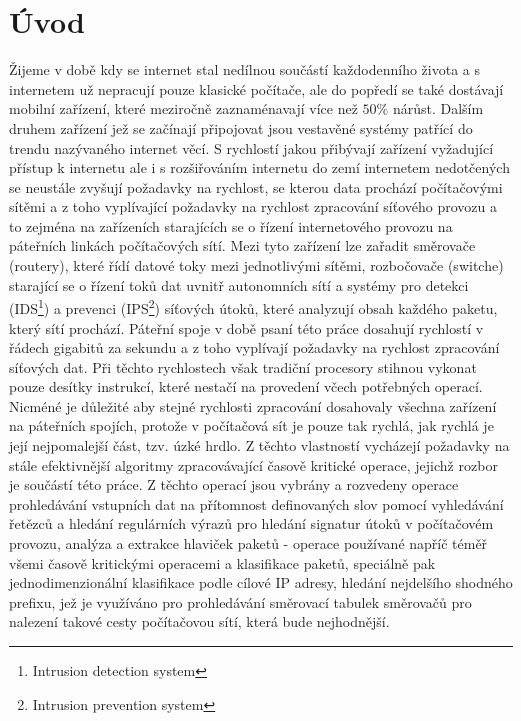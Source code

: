 
\chapter{Úvod}
Žijeme v době kdy se internet stal nedílnou součástí každodenního života a s internetem už nepracují
pouze klasické počítače, ale do popředí se také dostávají mobilní zařízení, které meziročně
zaznaménavají více než $50\%$ nárůst. Dalším druhem zařízení jež se začínají připojovat
jsou vestavěné systémy patřící do trendu nazývaného internet věcí.
S rychlostí jakou přibývají zařízení vyžadující přístup k internetu ale i s rozšiřováním internetu
do zemí internetem nedotčených se neustále zvyšují požadavky na rychlost, se kterou data prochází počítačovými
sítěmi a z toho vyplívající požadavky na rychlost zpracování síťového provozu a to zejména na zařízeních
starajících se o řízení internetového provozu na páteřních linkách počítačových sítí. Mezi tyto
zařízení lze zařadit směrovače (routery), které řídí datové toky mezi jednotlivými sítěmi,
rozbočovače (switche) starající se o řízení toků dat uvnitř autonomních sítí a
systémy pro detekci (IDS\footnote{Intrusion detection system}) a prevenci (IPS\footnote{Intrusion prevention system})
síťových útoků, které analyzují obsah každého paketu, který sítí prochází.
Páteřní spoje v době psaní této práce dosahují rychlostí v řádech gigabitů
za sekundu a z toho vyplívají požadavky na rychlost zpracování síťových dat. Při těchto rychlostech
však tradiční procesory stihnou vykonat pouze desítky instrukcí, které nestačí na provedení včech potřebných
operací. Nicméné je důležité aby stejné rychlosti zpracování dosahovaly všechna zařízení na páteřních spojích,
protože v počítačová sít je pouze tak rychlá, jak rychlá je její nejpomalejší část, tzv. úzké hrdlo.
Z těchto vlastností vycházejí požadavky na stále efektivnější algoritmy zpracovávající časově kritické operace,
jejichž rozbor je součástí této práce. Z těchto operací jsou vybrány a rozvedeny operace prohledávání vstupních
dat na přítomnost definovaných slov pomocí vyhledávání řetězců a  hledání regulárních výrazů pro hledání signatur
útoků v počítačovém provozu, analýza a extrakce hlaviček paketů - operace používané napříč téměř všemi časově kritickými operacemi a klasifikace paketů, speciálně pak jednodimenzionální klasifikace podle cílové IP adresy,
hledání nejdelšího shodného prefixu, jež je využíváno pro prohledávání směrovací tabulek směrovačů pro
nalezení takové cesty počítačovou sítí, která bude nejhodnější.

